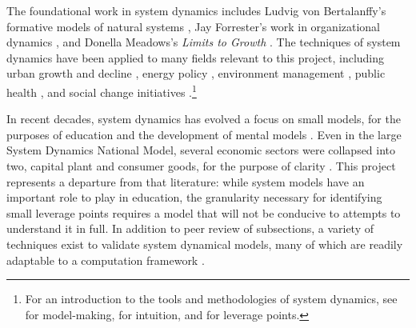 \documentclass[12pt, oneside]{amsart}
\begin{document}
The foundational work in system dynamics includes Ludvig von Bertalanffy's formative models of natural systems \citeyearpar{von1973general}, Jay Forrester's work in organizational dynamics \citeyearpar{forrester1961industrial}, and Donella Meadows's \emph{Limits to Growth} \citeyearpar{meadows2004limits}.  The techniques of system dynamics have been applied to many fields relevant to this project, including urban growth and decline \citep{alfeld1976introduction, forrester1971urban}, energy policy \citep{Naill1992}, environment management \citep{fletcher1998use, Guo2001}, public health \citep{Homer2001}, and social change initiatives \citep{repenning2002simulation}.\footnote{For an introduction to the tools and methodologies of system dynamics, see \cite{sterman2000business} for model-making,  \cite{senge2006fifth} for intuition, and \cite{meadows1997places} for leverage points.}

In recent decades, system dynamics has evolved a focus on small models, for the purposes of education and the development of mental models \cite[see][]{senge2006fifth, sterman1985strategem}.  Even in the large System Dynamics National Model, several economic sectors were collapsed into two, capital plant and consumer goods, for the purpose of clarity \citep{Forrester1991}.  This project represents a departure from that literature: while system models have an important role to play in education, the granularity necessary for identifying small leverage points requires a model that will not be conducive to attempts to understand it in full.  In addition to peer review of subsections, a variety of techniques exist to validate system dynamical models, many of 
which are readily adaptable to a computation framework \citep{barlas1996formal}.
\end{document}
